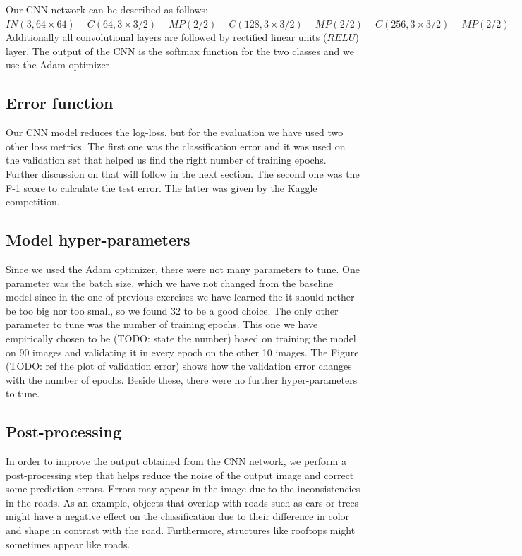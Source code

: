 \documentclass[10pt,conference,compsocconf]{IEEEtran}
\begin{document}
Our CNN network can be described as follows: \\
$IN(3, 64\times64)
-C(64, 3\times3 /2) - MP(2 / 2) - C(128, 3\times3 /2) - MP(2 / 2)
-C(256, 3\times3 /2) - MP(2 / 2) - C(512, 3\times3 /2) - MP(2 / 2)
-FC(2048)-FC(2048)-FC(2)$\\

Additionally all convolutional layers are followed by rectified linear units ($RELU$) layer. The output of the CNN is the softmax function for the two classes and we use the Adam optimizer \cite{adam}.


\subsection{Error function}
Our CNN model reduces the log-loss, but for the evaluation we have used two other loss metrics. The first one was
the classification error and it was used on the validation set that helped us find the right number of training epochs. 
Further discussion on that will follow in the next section. The second one was the F-1 score to calculate
the test error. The latter was given by the Kaggle competition.


\subsection{Model hyper-parameters}
Since we used the Adam optimizer, there were not many parameters to tune. One parameter was the batch size, which we 
have not changed from the baseline model since in the one of previous exercises we have learned the it should nether be too
big nor too small, so we found 32 to be a good choice. The only other parameter to tune was the number of training epochs.
This one we have empirically chosen to be (TODO: state the number) based on training the model on 90 images and 
validating it in every epoch on the other 10 images. The Figure (TODO: ref the plot of validation error) shows
how the validation error changes with the number of epochs. Beside these, there were no further hyper-parameters to tune.


\subsection{Post-processing}
In order to improve the output obtained from the CNN network, we perform a post-processing step that helps reduce the noise of the output image and correct some prediction errors. Errors may appear in the image due to the inconsistencies in the roads. As an example, objects that overlap with roads such as cars or trees might have a negative effect on the classification due to their difference in color and shape in contrast with the road. Furthermore, structures like rooftops might sometimes appear like roads.\\
\end{document}
